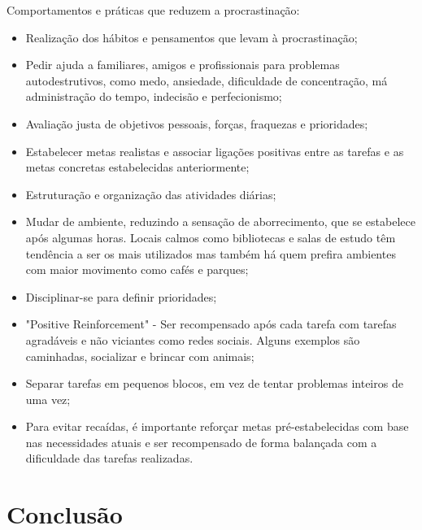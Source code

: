 \documentclass{report}
\begin{document}
Comportamentos e práticas que reduzem a procrastinação:
\begin{itemize}
  \item Realização dos hábitos e pensamentos que levam à procrastinação;
  
  \item Pedir ajuda a familiares, amigos e profissionais para problemas autodestrutivos, como medo, ansiedade, dificuldade de concentração, má administração do tempo, indecisão e perfecionismo;
  
  \item Avaliação justa de objetivos pessoais, forças, fraquezas e prioridades;

  \item Estabelecer metas realistas e associar ligações positivas entre as tarefas e as metas concretas estabelecidas anteriormente;

  \item Estruturação e organização das atividades diárias;

  \item Mudar de ambiente, reduzindo a sensação de aborrecimento, que se estabelece após algumas horas. Locais calmos como bibliotecas e salas de estudo têm tendência a ser os mais utilizados mas também há quem prefira ambientes com maior movimento como cafés e parques;
  
  \item    Disciplinar-se para definir prioridades;

  \item "Positive Reinforcement" - Ser recompensado após cada tarefa com tarefas agradáveis e não viciantes como redes sociais. Alguns exemplos são caminhadas, socializar e brincar com animais;
  
  \item Separar tarefas em pequenos blocos, em vez de tentar problemas inteiros de uma vez;

  \item Para evitar recaídas, é importante reforçar metas pré-estabelecidas com base nas necessidades atuais e ser recompensado de forma balançada com a dificuldade das tarefas realizadas.
  
 \end{itemize}




\chapter{Conclusão}
\label{chap.conclusao}
\end{document}
